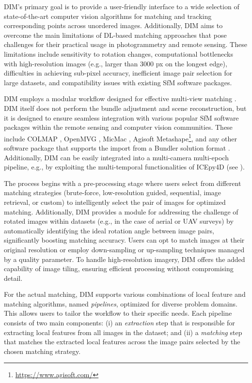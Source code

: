 DIM's primary goal is to provide a user-friendly interface to a wide selection of state-of-the-art computer vision algorithms for matching and tracking corresponding points across unordered images.
Additionally, DIM aims to overcome the main limitations of DL-based matching approaches that pose challenges for their practical usage in photogrammetry and remote sensing. 
These limitations include sensitivity to rotation changes, computational bottlenecks with high-resolution images (e.g., larger than 3000 px on the longest edge), difficulties in achieving sub-pixel accuracy, inefficient image pair selection for large datasets, and compatibility issues with existing SfM software packages.  

DIM employs a modular workflow designed for effective multi-view matching .
DIM itself does not perform the bundle adjustment and scene reconstruction, but it is designed to ensure seamless integration with various popular SfM software packages within the remote sensing and computer vision communities. 
These include COLMAP \citep{schoenberger2016sfm}, OpenMVG \citep{moulon2016openmvg}, MicMac \citep{rupnik2017micmac}, Agisoft Metashape\footnote{\url{https://www.agisoft.com/}}, 
and any other software package that supports the import from a Bundler solution format \citep{Li_Snavely_2018_MegaDepth}.
Additionally, DIM can be easily integrated into a multi-camera multi-epoch pipeline, e.g., by exploiting the multi-temporal functionalities of ICEpy4D (see ).

The process begins with a pre-processing stage where users select from different matching strategies (brute-force, low-resolution guided, sequential, image retrieval, or custom) to intelligently select the pair of images for optimized matching. 
Additionally, DIM provides a module for addressing the challenge of rotated images within datasets (e.g., in the case of aerial or UAV surveys) by automatically identifying the ideal rotation angle between image pairs, significantly boosting matching accuracy. Users can opt to match images at their original resolution or employ down-sampling or up-sampling techniques managed by a quality parameter.
To handle high-resolution imagery, DIM offers the added capability of image tiling, ensuring efficient processing without compromising detail. 

For the actual matching, DIM supports various combinations of local feature and matching algorithms, named \textit{pipelines}, optimized for diverse problem domains. This allows users to tailor the workflow to their specific needs. 
Each pipeline consists of two main components: (i) an \textit{extraction} step that is responsible for extracting local features from all images in the dataset; and (ii) a \textit{matching} step that matches the extracted local features across the image pairs selected by the chosen matching strategy.  

